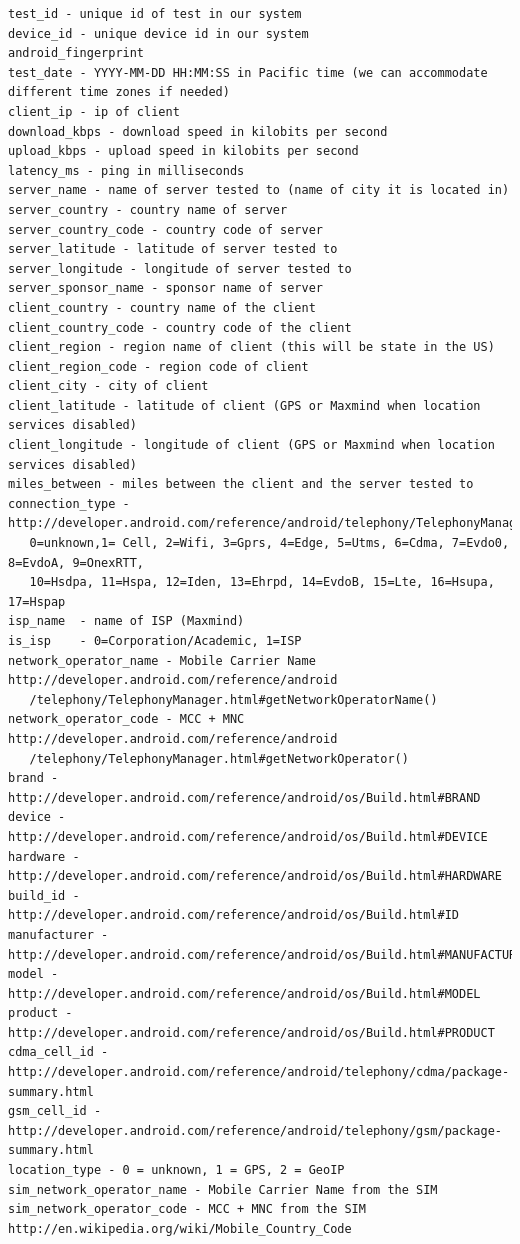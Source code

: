 \documentclass[]{article}
\begin{document}
\begin{verbatim}
test_id - unique id of test in our system
device_id - unique device id in our system
android_fingerprint
test_date - YYYY-MM-DD HH:MM:SS in Pacific time (we can accommodate different time zones if needed)
client_ip - ip of client
download_kbps - download speed in kilobits per second
upload_kbps - upload speed in kilobits per second
latency_ms - ping in milliseconds
server_name - name of server tested to (name of city it is located in)
server_country - country name of server
server_country_code - country code of server
server_latitude - latitude of server tested to
server_longitude - longitude of server tested to
server_sponsor_name - sponsor name of server
client_country - country name of the client
client_country_code - country code of the client
client_region - region name of client (this will be state in the US)
client_region_code - region code of client
client_city - city of client
client_latitude - latitude of client (GPS or Maxmind when location services disabled)
client_longitude - longitude of client (GPS or Maxmind when location services disabled)
miles_between - miles between the client and the server tested to
connection_type - http://developer.android.com/reference/android/telephony/TelephonyManager.html
   0=unknown,1= Cell, 2=Wifi, 3=Gprs, 4=Edge, 5=Utms, 6=Cdma, 7=Evdo0, 8=EvdoA, 9=OnexRTT, 
   10=Hsdpa, 11=Hspa, 12=Iden, 13=Ehrpd, 14=EvdoB, 15=Lte, 16=Hsupa, 17=Hspap
isp_name  - name of ISP (Maxmind)
is_isp    - 0=Corporation/Academic, 1=ISP
network_operator_name - Mobile Carrier Name http://developer.android.com/reference/android
   /telephony/TelephonyManager.html#getNetworkOperatorName()
network_operator_code - MCC + MNC  http://developer.android.com/reference/android
   /telephony/TelephonyManager.html#getNetworkOperator() 
brand - http://developer.android.com/reference/android/os/Build.html#BRAND 
device - http://developer.android.com/reference/android/os/Build.html#DEVICE 
hardware - http://developer.android.com/reference/android/os/Build.html#HARDWARE 
build_id - http://developer.android.com/reference/android/os/Build.html#ID 
manufacturer - http://developer.android.com/reference/android/os/Build.html#MANUFACTURER 
model - http://developer.android.com/reference/android/os/Build.html#MODEL 
product - http://developer.android.com/reference/android/os/Build.html#PRODUCT  
cdma_cell_id - http://developer.android.com/reference/android/telephony/cdma/package-summary.html 
gsm_cell_id - http://developer.android.com/reference/android/telephony/gsm/package-summary.html 
location_type - 0 = unknown, 1 = GPS, 2 = GeoIP
sim_network_operator_name - Mobile Carrier Name from the SIM
sim_network_operator_code - MCC + MNC from the SIM  http://en.wikipedia.org/wiki/Mobile_Country_Code 
\end{verbatim}
\end{document}
